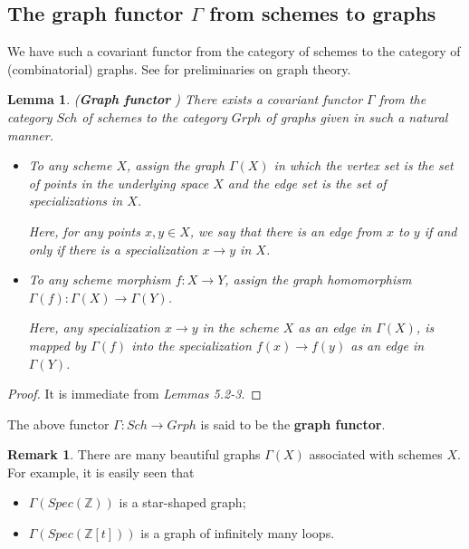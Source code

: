 \documentclass[12pt,twoside,reqno]{amsart}
\newtheorem{lemma}[theorem]{Lemma}
\theoremstyle{definition}
\newtheorem{remark}[theorem]{Remark}
\numberwithin{equation}{section}
\begin{document}
\subsection{The graph functor $\Gamma$ from schemes to graphs}

We have such a covariant functor from the category of schemes to
the category of (combinatorial) graphs. See \cite{tut} for preliminaries on graph theory.


\begin{lemma}
\emph{(\textbf{Graph functor} \cite{An1})}
There exists a covariant functor $\Gamma$ from the category $Sch$ of
schemes to the category $Grph$ of graphs given in such a natural
manner.
\begin{itemize}
\item To any scheme $X$, assign the graph $\Gamma(X)$ in which the
vertex set is the set of points in the underlying space $X$ and the
edge set is the set of specializations in $X$.

Here, for any points $x,y \in X$, we say that there is an edge from
$x$ to $y$ if and only if there is a specialization $x\rightarrow y$
in $X$.

\item To any scheme morphism $f:X\rightarrow Y$, assign the graph
homomorphism $\Gamma(f): \Gamma(X)\rightarrow \Gamma(Y)$.

Here, any specialization $x \rightarrow y$ in the scheme $X$ as
an edge in $\Gamma(X)$, is mapped by $\Gamma(f)$ into the
specialization $f(x)\rightarrow f(y)$ as an edge in $\Gamma(Y)$.
\end{itemize}
\end{lemma}

\begin{proof}
It is immediate from \emph{Lemmas 5.2-3}.
\end{proof}

The above functor $\Gamma: Sch\to Grph$ is said to be the \textbf{graph functor}.

\begin{remark}
There are many beautiful  graphs $\Gamma(X)$ associated with schemes $X$. For example, it is easily seen that
\begin{itemize}
\item $\Gamma(Spec(\mathbb{Z}))$  is a star-shaped graph;

\item $\Gamma(Spec(\mathbb{Z}[t]))$ is a graph of
infinitely many loops.
\end{itemize}
\end{remark}
\end{document}

